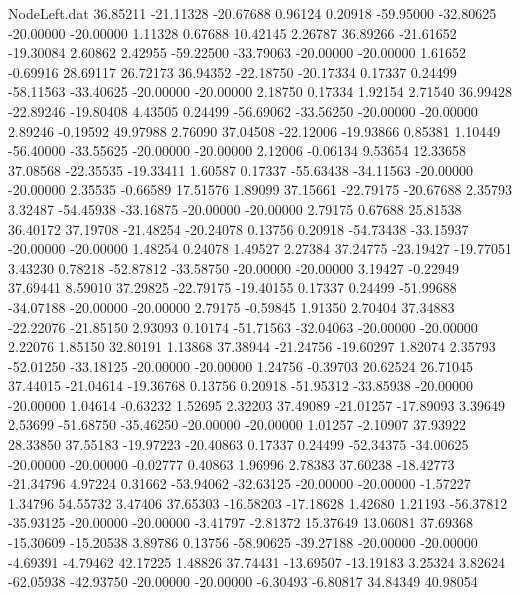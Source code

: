 \begin{filecontents}{NodeLeft.dat}
  36.85211  -21.11328  -20.67688     0.96124    0.20918  -59.95000  -32.80625  -20.00000  -20.00000    1.11328    0.67688   10.42145    2.26787
  36.89266  -21.61652  -19.30084     2.60862    2.42955  -59.22500  -33.79063  -20.00000  -20.00000    1.61652   -0.69916   28.69117   26.72173
  36.94352  -22.18750  -20.17334     0.17337    0.24499  -58.11563  -33.40625  -20.00000  -20.00000    2.18750    0.17334    1.92154    2.71540
  36.99428  -22.89246  -19.80408     4.43505    0.24499  -56.69062  -33.56250  -20.00000  -20.00000    2.89246   -0.19592   49.97988    2.76090
  37.04508  -22.12006  -19.93866     0.85381    1.10449  -56.40000  -33.55625  -20.00000  -20.00000    2.12006   -0.06134    9.53654   12.33658
  37.08568  -22.35535  -19.33411     1.60587    0.17337  -55.63438  -34.11563  -20.00000  -20.00000    2.35535   -0.66589   17.51576    1.89099
  37.15661  -22.79175  -20.67688     2.35793    3.32487  -54.45938  -33.16875  -20.00000  -20.00000    2.79175    0.67688   25.81538   36.40172
  37.19708  -21.48254  -20.24078     0.13756    0.20918  -54.73438  -33.15937  -20.00000  -20.00000    1.48254    0.24078    1.49527    2.27384
  37.24775  -23.19427  -19.77051     3.43230    0.78218  -52.87812  -33.58750  -20.00000  -20.00000    3.19427   -0.22949   37.69441    8.59010
  37.29825  -22.79175  -19.40155     0.17337    0.24499  -51.99688  -34.07188  -20.00000  -20.00000    2.79175   -0.59845    1.91350    2.70404
  37.34883  -22.22076  -21.85150     2.93093    0.10174  -51.71563  -32.04063  -20.00000  -20.00000    2.22076    1.85150   32.80191    1.13868
  37.38944  -21.24756  -19.60297     1.82074    2.35793  -52.01250  -33.18125  -20.00000  -20.00000    1.24756   -0.39703   20.62524   26.71045
  37.44015  -21.04614  -19.36768     0.13756    0.20918  -51.95312  -33.85938  -20.00000  -20.00000    1.04614   -0.63232    1.52695    2.32203
  37.49089  -21.01257  -17.89093     3.39649    2.53699  -51.68750  -35.46250  -20.00000  -20.00000    1.01257   -2.10907   37.93922   28.33850
  37.55183  -19.97223  -20.40863     0.17337    0.24499  -52.34375  -34.00625  -20.00000  -20.00000   -0.02777    0.40863    1.96996    2.78383
  37.60238  -18.42773  -21.34796     4.97224    0.31662  -53.94062  -32.63125  -20.00000  -20.00000   -1.57227    1.34796   54.55732    3.47406
  37.65303  -16.58203  -17.18628     1.42680    1.21193  -56.37812  -35.93125  -20.00000  -20.00000   -3.41797   -2.81372   15.37649   13.06081
  37.69368  -15.30609  -15.20538     3.89786    0.13756  -58.90625  -39.27188  -20.00000  -20.00000   -4.69391   -4.79462   42.17225    1.48826
  37.74431  -13.69507  -13.19183     3.25324    3.82624  -62.05938  -42.93750  -20.00000  -20.00000   -6.30493   -6.80817   34.84349   40.98054

\end{filecontents}

